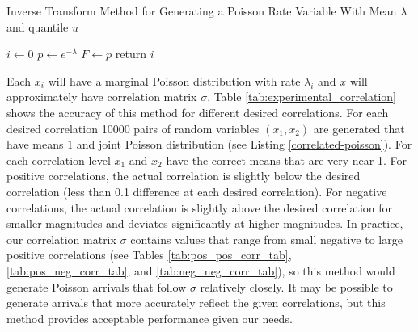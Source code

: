 \begin{algorithm}[H]
\SetAlgoLined
\caption{Inverse Transform Method for Generating a Poisson Rate Variable With Mean $\lambda$ and quantile $u$}
 $i \leftarrow 0$\;
 $p \leftarrow e^{-\lambda}$\;
 $F \leftarrow p$\;
 return $i$ \;
\end{algorithm}

Each $x_i$ will have a marginal Poisson distribution with rate $\lambda_i$ and $x$ will approximately have correlation matrix $\sigma$. Table \ref{tab:experimental_correlation} shows the accuracy of this method for different desired correlations. For each desired correlation 10000 pairs of random variables $(x_1,x_2)$ are generated that have means $1$ and joint Poisson distribution (see Listing \ref{correlated-poisson}). For each correlation level $x_1$ and $x_2$ have the correct means that are very near 1. For positive correlations, the actual correlation is slightly below the desired correlation (less than 0.1 difference at each desired correlation). For negative correlations, the actual correlation is slightly above the desired correlation for smaller magnitudes and deviates significantly at higher magnitudes. In practice, our correlation matrix $\sigma$ contains values that range from small negative to large positive correlations (see Tables \ref{tab:pos_pos_corr_tab}, \ref{tab:pos_neg_corr_tab}, and \ref{tab:neg_neg_corr_tab}), so this method would generate Poisson arrivals that follow $\sigma$ relatively closely. It may be possible to generate arrivals that more accurately reflect the given correlations, but this method provides acceptable performance given our needs.

